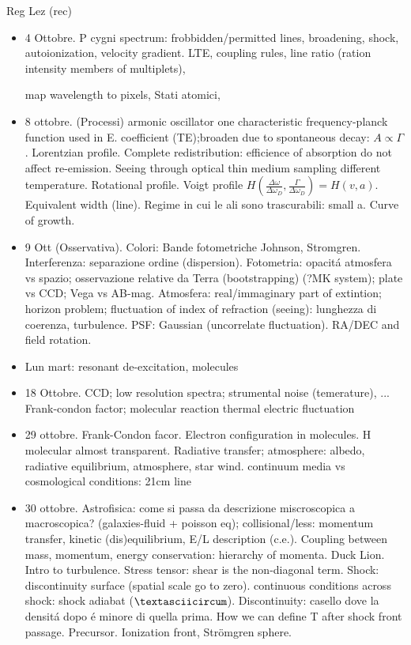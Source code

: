 \begin{frame}[allowframebreaks]{Reg Lez (rec)}

\begin{itemize}
\item 4 Ottobre. P cygni spectrum: frobbidden/permitted lines, broadening, shock, autoionization, velocity gradient.
LTE, coupling rules, line ratio (ration intensity members of multiplets),

 map wavelength to pixels, Stati atomici,
\item 8 ottobre. (Processi) armonic oscillator one characteristic frequency-planck function used in E. coefficient  (TE);broaden due to spontaneous decay: $A\propto\Gamma$. Lorentzian profile. Complete redistribution: efficience of absorption do not affect re-emission.
Seeing through optical thin medium sampling different temperature. Rotational profile. Voigt profile $H(\frac{\Delta\omega}{\Delta\omega_D},\frac{\Gamma}{\Delta\omega_D})=H(v,a)$. Equivalent width (line). Regime in cui le ali sono trascurabili: small a. Curve of growth.
\item 9 Ott (Osservativa). Colori: Bande fotometriche Johnson, Str\:omgren. Interferenza: separazione ordine (dispersion). Fotometria: opacit\'a atmosfera vs spazio; osservazione relative da Terra (bootstrapping) (?MK system); plate vs CCD; Vega vs AB-mag. Atmosfera: real/immaginary part of extintion; horizon problem; fluctuation of index of refraction (seeing): lunghezza di coerenza, turbulence. PSF: Gaussian (uncorrelate fluctuation). RA/DEC and field rotation.

\item Lun mart: resonant de-excitation, molecules

\item 18 Ottobre. CCD; low resolution spectra; strumental noise (temerature), ...
Frank-condon factor; molecular reaction
thermal electric fluctuation
\item 29 ottobre. Frank-Condon facor. Electron configuration in molecules. H molecular almost transparent. Radiative transfer; atmosphere: albedo, radiative equilibrium, atmosphere, star wind.
continuum media vs cosmological conditions: 21cm line
\item 30 ottobre. Astrofisica: come si passa da descrizione miscroscopica a macroscopica? (galaxies-fluid + poisson eq); collisional/less: momentum transfer, kinetic (dis)equilibrium, E/L description (c.e.). Coupling between mass, momentum, energy conservation: hierarchy of momenta. Duck Lion. Intro to turbulence. Stress tensor: shear is the non-diagonal term. Shock: discontinuity surface (spatial scale go to zero). continuous conditions across shock: shock adiabat ($\textasciicircum$). Discontinuity: casello dove la densit\'a dopo \'e minore di quella prima. How we can define T after shock front passage. Precursor. Ionization front, Str\"omgren sphere.


\end{itemize}
\end{frame}
